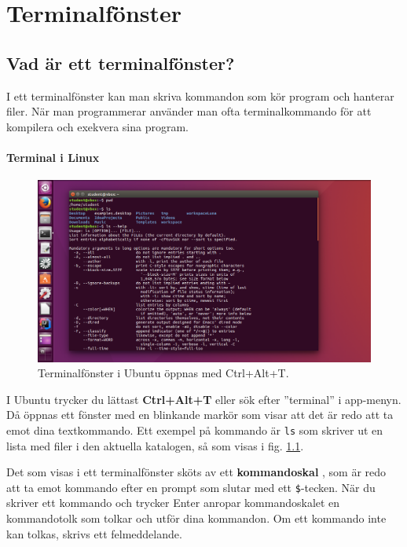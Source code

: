 
\chapter{Terminalfönster}\label{appendix:terminal}

\section{Vad är ett terminalfönster?}

I ett terminalfönster kan man skriva kommandon som kör program och hanterar filer. När man programmerar använder man ofta terminalkommando för att kompilera och exekvera sina program.  
 
\subsubsection{Terminal i Linux}

    \begin{figure}[!b]
    \centering
    \includegraphics[width=1.0\textwidth]{../img/linux-terminal.png}
    \caption{Terminalfönster i Ubuntu öppnas med Ctrl+Alt+T.}
    \label{fig:terminal:linux}
    \end{figure}

I Ubuntu trycker du lättast \textbf{Ctrl+Alt+T} eller sök efter ''terminal'' i app-menyn.  Då öppnas ett fönster med en blinkande markör som visar att det är redo att ta emot dina textkommando. Ett exempel på kommando är \texttt{ls} som skriver ut en lista med filer i den aktuella katalogen, så som visas i fig. \ref{fig:terminal:linux}.

Det som visas i ett terminalfönster sköts av ett \textbf{kommandoskal} , som är redo att ta emot kommando efter en prompt som slutar med ett \texttt{\$}-tecken. När du skriver ett kommando och trycker Enter anropar kommandoskalet en kommandotolk som tolkar och utför dina kommandon. Om ett kommando inte kan tolkas, skrivs ett felmeddelande. 

